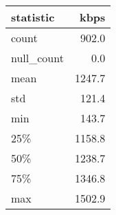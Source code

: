 \begin{tabular}{lr}
    \toprule
    statistic & kbps \\
    \midrule
    count & 902.0 \\
    null\_count & 0.0 \\
    mean & 1247.7 \\
    std & 121.4 \\
    min & 143.7 \\
    25\% & 1158.8 \\
    50\% & 1238.7 \\
    75\% & 1346.8 \\
    max & 1502.9 \\
    \bottomrule
\end{tabular}

